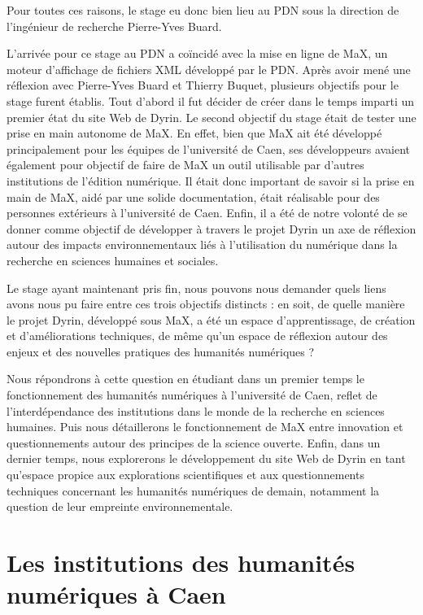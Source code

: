 \documentclass[a4paper,12pt,twoside]{book}
\begin{document}
Pour toutes ces raisons, le stage eu donc bien lieu au \acrshort{PDN} sous la direction de l'ingénieur de recherche Pierre-Yves Buard.

L'arrivée pour ce stage au \acrshort{PDN} a coïncidé avec la mise en ligne de MaX, un moteur d'affichage de fichiers XML développé par le \acrshort{PDN}. Après avoir mené une réflexion avec Pierre-Yves Buard et Thierry Buquet, plusieurs objectifs pour le stage furent établis.
Tout d'abord il fut décider de créer dans le temps imparti un premier état du site Web de Dyrin. Le second objectif du stage était de tester une prise en main autonome de MaX. En effet, bien que MaX ait été développé principalement pour les équipes de l'université de Caen, ses développeurs avaient également pour objectif de faire de MaX un outil utilisable par d'autres institutions de l'édition numérique. Il était donc important de savoir si la prise en main de MaX, aidé par une solide documentation, était réalisable pour des personnes extérieurs à l'université de Caen. Enfin, il a été de notre volonté de se donner comme objectif de développer à travers le projet Dyrin un axe de réflexion autour des impacts environnementaux liés à l'utilisation du numérique dans la recherche en sciences humaines et sociales.

Le stage ayant maintenant pris fin, nous pouvons nous demander quels liens avons nous pu faire entre ces trois objectifs distincts : en soit, de quelle manière le projet Dyrin, développé sous MaX, a été un espace d'apprentissage, de création et d'améliorations techniques, de même qu'un espace de réflexion autour des enjeux et des nouvelles pratiques des humanités numériques ?

Nous répondrons à cette question en étudiant dans un premier temps le fonctionnement des humanités numériques à l'université de Caen, reflet de l'interdépendance des institutions dans le monde de la recherche en sciences humaines. Puis nous détaillerons le fonctionnement de MaX entre innovation et questionnements autour des principes de la science ouverte. Enfin, dans un dernier temps, nous explorerons le développement du site Web de Dyrin en tant qu'espace propice aux explorations scientifiques et aux questionnements techniques concernant les humanités numériques de demain, notamment la question de leur empreinte environnementale.

	\thispagestyle{empty}
	\cleardoublepage
	
	\mainmatter 
 
 \part{Les institutions des humanités numériques à Caen}
 
\end{document}
